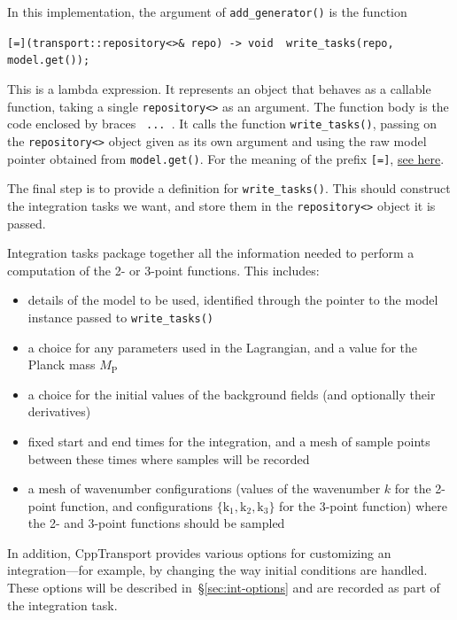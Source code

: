 \documentclass[11pt,a4paper]{article}
\newcommand{\Mp}{M_{\mathrm{P}}}
\newcommand{\vect}[1]{\bm{\mathrm{{#1}}}}
\newcommand{\packagefont}{\sffamily}
\newcommand{\CppTransport}{{\packagefont CppTransport}}
\newcommand{\semibold}[1]{{\fontseries{b}\selectfont{#1}}}
\newcommand{\para}[1]{\par\vspace{2mm}\noindent\semibold{{#1.}---}\ignorespaces}
\begin{document}
In this implementation, the argument of \texttt{add_generator()}
is the function
\begin{center}
    \texttt{[=](transport::repository<>& repo) -> void { write_tasks(repo, model.get()); }}
\end{center}
This is a lambda expression. It represents an object that behaves as a callable function,
taking a single \texttt{repository<>} as an argument.
The function body is the code enclosed by braces
\texttt{{ ... }}.
It calls the function \texttt{write_tasks()},
passing on the \texttt{repository<>} object
given as its own argument
and using the raw model pointer obtained from
\texttt{model.get()}.
For the meaning of the prefix
\texttt{[=]},
\href{http://en.cppreference.com/w/cpp/language/lambda}{see here}.

\para{Building a task}
The final step is to provide a definition
for \texttt{write_tasks()}.
This should construct the integration tasks we want, and store them
in the \texttt{repository<>} object it is passed.

Integration tasks package together all the information needed
to perform a computation of the 2- or 3-point functions.
This includes:
\begin{itemize}
	\item details of the model to be used, identified
	through the pointer to the model instance
	passed to \texttt{write_tasks()}
	
	\item a choice for any parameters
	used in the Lagrangian,
	and a value for the Planck mass $\Mp$
	
	\item a choice for the initial values of the background
	fields (and optionally their derivatives)
	
	\item fixed start and end times for the integration, and a mesh
	of sample points between these times where samples will be recorded
	
	\item a mesh of wavenumber configurations
	(values of the wavenumber $k$ for the 2-point function,
	and configurations $\{ \vect{k}_1, \vect{k}_2, \vect{k}_3 \}$ for the
	3-point function)
	where the 2- and 3-point functions should be sampled
\end{itemize}
In addition, {\CppTransport} provides various options for customizing an
integration---for example, by changing the way initial conditions are handled.
These options will be described in~\S\ref{sec:int-options}
and are recorded as part of the integration task.
\end{document}
